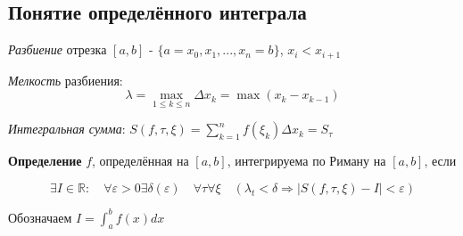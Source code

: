 \documentclass[a4paper]{article}
\begin{document}
\newpage

\begin{definit}
\hypertarget{p1}{}
\subsection*{Понятие определённого интеграла}

\textit{Разбиение} отрезка $[a, b]$ - $\{ a = x_0, x_1, ..., x_n = b\}$, $x_i < x_{i+1}$

\textit{Мелкость} разбиения: $$\lambda = \max_{1 \leq k \leq n} \Delta x_k = \max (x_k - x_{k-1})$$

\textit{Интегральная сумма}: $S(f, \tau, \xi) = \sum_{k=1}^n f(\xi_k) \Delta x_k = S_\tau$

\textbf{Определение} $f$, определённая на $[a,b]$, интегрируема по Риману на $[a,b]$, если

$$\exists I \in \mathbb{R}: \quad \forall \varepsilon > 0 \exists \delta (\varepsilon) \quad \forall \tau  \forall \xi \quad (\lambda_t < \delta \Rightarrow |S(f, \tau, \xi) - I| < \varepsilon)$$

Обозначаем $I = \int_a^b f(x)dx$


\end{definit}
\end{document}
